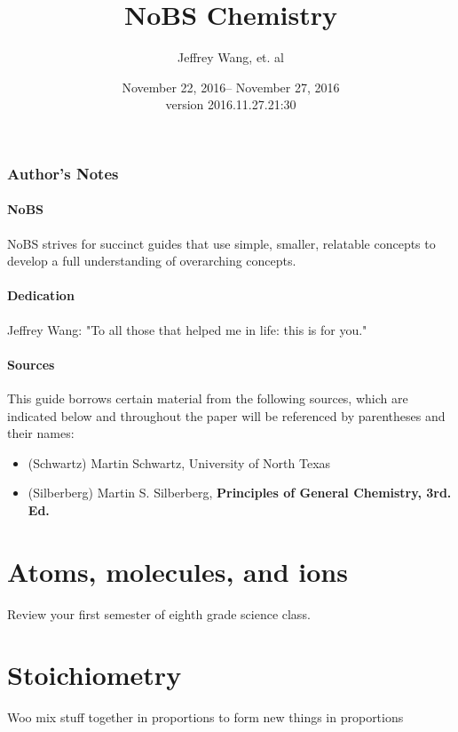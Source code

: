 \documentclass[letterpaper, 12pt]{article}
\begin{document}
\title{NoBS Chemistry}
\author{Jeffrey Wang, et. al}
\date{November 22, 2016-- November 27, 2016\\version 2016.11.27.21:30}
\maketitle


\setcounter{secnumdepth}{1}
\setcounter{section}{0}


\tableofcontents
\clearpage

\section*{Author's Notes}
	\subsection{NoBS}
	NoBS strives for succinct guides that use simple, smaller, relatable concepts to develop a full understanding of overarching concepts.
	\subsection{Dedication}
	Jeffrey Wang: "To all those that helped me in life: this is for you."
	\subsection{Sources}
	This guide borrows certain material from the following sources, which are indicated below and throughout the paper will be referenced by parentheses and their names:
	\begin{itemize}
		\item (Schwartz) Martin Schwartz, University of North Texas
		\item (Silberberg) Martin S. Silberberg,  \textbf{Principles of General Chemistry, 3rd. Ed.}
	\end{itemize}
\clearpage

	
\clearpage

\part{Atoms, molecules, and ions}
Review your first semester of eighth grade science class.

\clearpage

\part{Stoichiometry}
Woo mix stuff together in proportions to form new things in proportions
\end{document}

